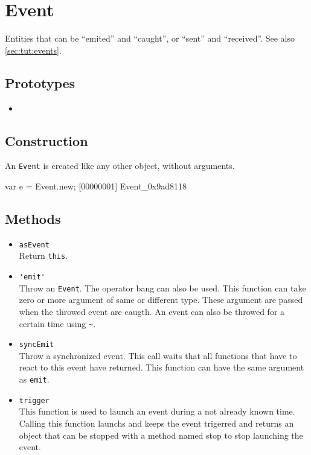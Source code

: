 \section{Event}
Entities that can be ``emited'' and ``caught'', or ``sent'' and
``received''.  See also \autoref{sec:tut:events}.

\subsection{Prototypes}
\begin{itemize}
\item {}
\end{itemize}

\subsection{Construction}

An \lstinline{Event} is created like any other object, without arguments.

\begin{urbiscript}
var e = Event.new;
[00000001] Event_0x9ad8118
\end{urbiscript}

\subsection{Methods}
\begin{itemize}
\item \lstinline|asEvent|\\
  Return \lstinline|this|.

\item \lstinline|'emit'|\\
  Throw an \lstinline|Event|. The operator bang can also be used. This
  function can take zero or more argument of same or different type.
  These argument are passed when the throwed event are caugth. An
  event can also be throwed for a certain time using \lstinline|~|.

\item \lstinline|syncEmit|\\
  Throw a synchronized event. This call waits that all functions that
  have to react to this event have returned. This function can have
  the same argument as \lstinline|emit|.

\item \lstinline|trigger|\\
  This function is used to launch an event during a not already known
  time. Calling this function launchs and keeps the event trigerred
  and returns an object that can be stopped with a method named stop
  to stop launching the event.
\end{itemize}

